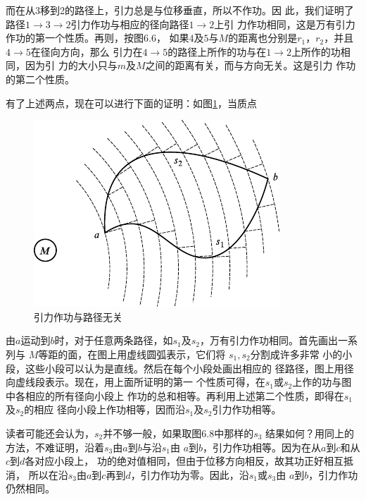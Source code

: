 而在从3移到2的路径上，引力总是与位移垂直，所以不作功。因
此，我们证明了路径$1 \to 3 \to 2$引力作功与相应的径向路径$ 1 \to 2 $上引
力作功相同，这是万有引力作功的第一个性质。再则，按图6.6，
如果$ 4 $及$ 5 $与$ M $的距离也分别是$ r_1 $，$ r_2 $，并且$ 4 \to 5 $在径向方向，那么
引力在$ 4 \to 5 $的路径上所作的功与在$ 1 \to 2 $上所作的功相同，因为引
力的大小只与$ m $及$ M $之间的距离有关，而与方向无关。这是引力
作功的第二个性质。

有了上述两点，现在可以进行下面的证明：如图\ref{fig:06.07}，当质点
\begin{figure}
  \vspace{-1.3em}
  \centering
  \includegraphics{figure/fig06.07}
  \caption{引力作功与路径无关}
  \label{fig:06.07}
\end{figure}
由$ a $运动到$ b $时，对于任意两条路径，如$ s _ { 1 } $及$
  s _ { 2 } $，万有引力作功相同。首先画出一系列与
$ M $等距的面，在图上用虚线圆弧表示，它们将
$ s _ { 1 } , s _ { 2 } $分割成许多非常
小的小段，这些小段可以认为是直线。然后在每个小段处画出相应的
径路径，图上用径向虚线段表示。现在，用上面所证明的第一
个性质可得，在$ s _ { 1 } $或$ s _ { 2 } $上作的功与图中各相应的所有径向小段上
作功的总和相等。再利用上述第二个性质，即得在$ s _ { 1 } $ 及$ s _ { 2 } $的相应
径向小段上作功相等，因而沿$ s _ { 1 } $及$ s _ { 2 } $引力作功相等。

读者可能还会认为，$ s _ { 2 } $并不够一般，如果取图6.8中那样的$ s _ { 3 } $
结果如何？用同上的方法，不难证明，沿着$ s _ { 3 } $由$ a $到$ b $与沿$ s _ { 1 } $由
$ a $到$ b $，引力作功相等。因为在从$ a $到$ c $和从$ c $到$ d $各对应小段上，
功的绝对值相同，但由于位移方向相反，故其功正好相互抵消，
所以在沿$ s _ { 3 } $由$ a $到$ c $再到$ d $，引力作功为零。因此，沿$ s _ { 1 } $或$ s _ { 3 } $由
$ a $到$ b $，引力作功仍然相同。

